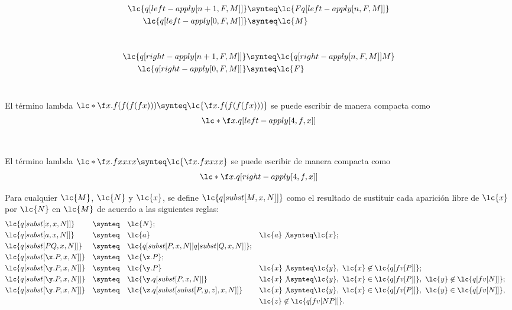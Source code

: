 \begin{align*}
  \lc{q[left-apply[n+1,F,M]]} &\synteq \lc{F q[left-apply[n,F,M]]}\\
  \lc{q[left-apply[0,F,M]]}   &\synteq \lc{M}
\end{align*} \

\begin{align*}
  \lc{q[right-apply[n+1,F,M]]} &\synteq \lc{q[right-apply[n,F,M]] M}\\
  \lc{q[right-apply[0,F,M]]}   &\synteq \lc{F}
\end{align*} \

\begin{ejemplo} El término lambda \(\lc*{\f x.f(f(f(f x)))} \synteq \lc{\f
    x.f(f(f(f x)))}\) se puede escribir de manera compacta como
  \[\lc*{\f x.q[left-apply[4,f,x]]}\]
\end{ejemplo} \

\begin{ejemplo} El término lambda \(\lc*{\f x.f x x x x} \synteq \lc{\f x.f x x
    x x}\) se puede escribir de manera compacta como
  \[\lc*{\f x.q[right-apply[4,f,x]]}\]
\end{ejemplo}

\begin{defi}[Sustitución] Para cualquier \(\lc{M}\), \(\lc{N}\) y \(\lc{x}\), se
  define \(\lc{q[subst[M,x,N]]}\) como el resultado de sustituir cada aparición
  libre de \(\lc{x}\) por \(\lc{N}\) en \(\lc{M}\) de acuerdo a las siguientes
  reglas:
  \label{definicion:sustitucion}
  \begin{align*}
    &\lc{q[subst[x,x,N]]} & &\synteq & &\lc{N}; \\
    &\lc{q[subst[a,x,N]]} & &\synteq & &\lc{a} & &\lc{a} \not\synteq \lc{x}; \\
    &\lc{q[subst[P Q,x,N]]} & &\synteq & &\lc{q[subst[P,x,N]] q[subst[Q,x,N]]}; \\
    &\lc{q[subst[\x.P,x,N]]} & &\synteq & &\lc{\x.P}; \\
    &\lc{q[subst[\y.P,x,N]]} & &\synteq & &\lc{\y.P} & &\lc{x}\not\synteq \lc{y},\ \lc{x} \not\in \lc{q[fv[P]]}; \\
    &\lc{q[subst[\y.P,x,N]]} & &\synteq & &\lc{\y.q[subst[P,x,N]]} & &\lc{x}\not\synteq \lc{y},\ \lc{x}\in\lc{q[fv[P]]},\ \lc{y}\not\in \lc{q[fv[N]]}; \\
    &\lc{q[subst[\y.P,x,N]]} & &\synteq & &\lc{\z.q[subst[subst[P,y,z],x,N]]} & &\lc{x}\not\synteq \lc{y},\ \lc{x}\in\lc{q[fv[P]]},\ \lc{y}\in \lc{q[fv[N]]}, \\
    & & & & & & & \lc{z}\not\in \lc{q[fv[N P]]}.
  \end{align*} \
\end{defi}

